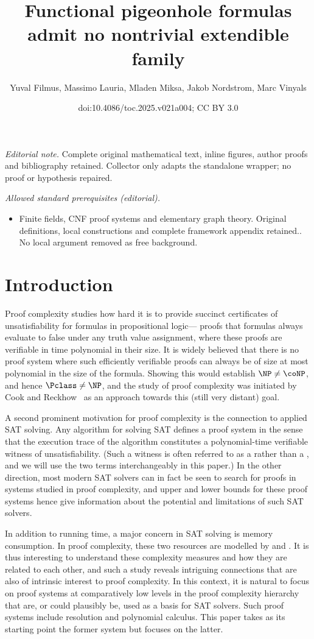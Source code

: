 \documentclass[11pt]{article}
\title{Functional pigeonhole formulas admit no nontrivial extendible family}
\author{Yuval Filmus, Massimo Lauria, Mladen Miksa, Jakob Nordstrom, Marc Vinyals}
\date{doi:10.4086/toc.2025.v021a004; CC BY 3.0}
\numberwithin{equation}{section}
\theoremstyle{definition}
\theoremstyle{plain}
\begin{document}
\maketitle
\noindent\textit{Editorial note.} Complete original mathematical text, inline figures, author proofs and bibliography retained. Collector only adapts the standalone wrapper; no proof or hypothesis repaired.\par\medskip
\noindent\textit{Allowed standard prerequisites (editorial).}\begin{itemize}
\item Finite fields, CNF proof systems and elementary graph theory. Original definitions, local constructions and complete framework appendix retained.. No local argument removed as free background.
\end{itemize}\medskip
\section{Introduction}
\label{sec:introduction}

Proof complexity studies how hard it is to provide succinct
certificates of unsatisfiability for formulas in propositional logic---\ieComma
proofs that formulas always evaluate to false under any truth value
assignment, where these proofs are verifiable in time polynomial in
their size.
%
It is widely believed that there is no proof system where such
efficiently verifiable proofs can always be  of size at most
polynomial in the size of the formula.
%
Showing this would establish $\NP \neq \coNP$, and hence
$\Pclass \neq \NP$, and the study of proof complexity was initiated by
Cook and Reckhow~\cite{CR79Relative} as an approach towards this
(still very distant) goal.

A second prominent motivation for proof complexity is the connection
to applied SAT solving. 
%
Any algorithm for solving SAT defines a proof system in the
sense that the execution trace of the algorithm constitutes a
polynomial-time verifiable witness of unsatisfiability. %
(Such a witness
is often referred to as a  rather than a
, and we will use the two terms interchangeably in
this paper.) %
In the other direction, most modern SAT solvers can in
fact be seen to search for proofs in systems studied in proof
complexity, and upper and lower bounds for these proof systems hence
give information about the potential and limitations of 
such SAT solvers.

In addition to running time, a major concern in SAT solving is memory
consumption. 
In proof complexity, these two resources are modelled by
and
.
%
It is thus interesting to understand these
complexity measures and how they are related to each other, and such a
study reveals intriguing connections that are also of intrinsic
interest to proof complexity. In this context, it is natural to focus
on proof systems at comparatively low levels in the proof complexity
hierarchy that are, or could plausibly be, used as a basis for SAT
solvers. Such proof systems include resolution and polynomial
calculus. This paper takes as its starting point the former system but
focuses on the latter.
\end{document}
